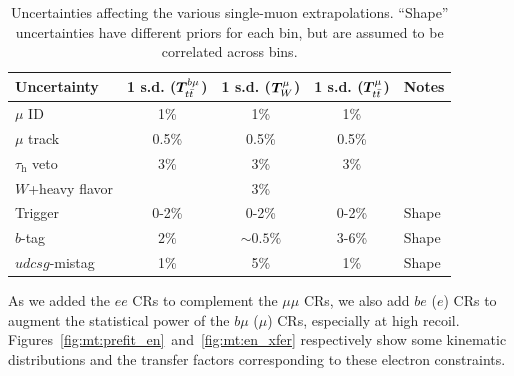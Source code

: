 \begin{table}[]
    \begin{center}
    \caption{Uncertainties affecting the various single-muon extrapolations.
            ``Shape'' uncertainties have different priors for each bin, but are assumed to be correlated across bins.}
    \label{tab:mt:zmm_uncs}
    \begin{tabular}{lcccl}
        Uncertainty                   & 1 s.d. ($\bm{T}^{b\mu}_{t\bar{t}}$) & 1 s.d. ($\bm{T}^{\mu}_{W}$) & 1 s.d. ($\bm{T}^{\mu}_{t\bar{t}}$)  & Notes \\
        \hline \hline
        $\mu$ ID                      & 1\%                         & 1\%                   & 1\%                         & \\
        $\mu$ track                   & 0.5\%                       & 0.5\%                 & 0.5\%                       & \\
        $\tau_\mathrm{h}$ veto        & 3\%                         & 3\%                   &  3\%                        & \\
        $W$+heavy flavor              &                             & 3\%                   &                             & \\
        Trigger                       & 0-2\%                       & 0-2\%                 &  0-2\%                      & Shape \\
        $b$-tag                       & $2\%$                       & $\sim0.5\%$           &  3-6\%                      & Shape \\
        $udcsg$-mistag                & 1\%                         & 5\%                   & 1\%                         & Shape \\
    \end{tabular}
\end{center}
\end{table}

As we added the $ee$ CRs to complement the $\mu\mu$ CRs, we also add $be$ ($e$) CRs to augment the statistical power of the $b\mu$ ($\mu$) CRs, especially at high recoil.
Figures~\ref{fig:mt:prefit_en}~and~\ref{fig:mt:en_xfer} respectively show some kinematic distributions and the transfer factors corresponding to these electron constraints.


